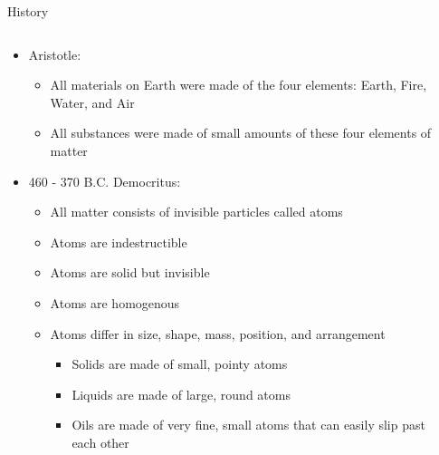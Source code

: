 \documentclass[10pt]{beamer}
\begin{document}
{\begin{frame}{History}
    \begin{columns}
        \begin{column}{0.8\textwidth}
            \begin{itemize}
                \item Aristotle:
                \begin{itemize}
                    \item All materials on Earth were made of the four elements: Earth, Fire, Water, and Air
                    \item All substances were made of small amounts of these four elements of matter
                \end{itemize}
                \item 460 - 370 B.C. Democritus:
                \begin{itemize}
                    \item All matter consists of invisible particles called atoms
                    \item Atoms are indestructible
                    \item Atoms are solid but invisible
                    \item Atoms are homogenous
                    \item Atoms differ in size, shape, mass, position, and arrangement
                    \begin{itemize}
                        \item Solids are made of small, pointy atoms
                        \item Liquids are made of large, round atoms
                        \item Oils are made of very fine, small atoms that can easily slip past each other
                    \end{itemize}
                \end{itemize}
            \end{itemize}
        \end{column}
        \begin{column}{0.16\textwidth}

\end{column}
\end{columns}
\end{frame}}
\end{document}
